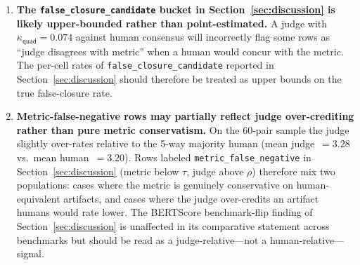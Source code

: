 \begin{enumerate}
  \item \textbf{The \texttt{false\_closure\_candidate} bucket in
        Section~\ref{sec:discussion} is likely upper-bounded rather
        than point-estimated.} A judge with $\kappa_{\textsf{quad}}
        = 0.074$ against human consensus will incorrectly flag some
        rows as ``judge disagrees with metric'' when a human would
        concur with the metric. The per-cell rates of
        \texttt{false\_closure\_candidate} reported in
        Section~\ref{sec:discussion} should therefore be treated as
        upper bounds on the true false-closure rate.

  \item \textbf{Metric-false-negative rows may partially reflect
        judge over-crediting rather than pure metric conservatism.}
        On the 60-pair sample the judge slightly over-rates relative
        to the 5-way majority human (mean judge~$= 3.28$ vs.\ mean
        human~$= 3.20$). Rows labeled \texttt{metric\_false\_negative}
        in Section~\ref{sec:discussion} (metric below $\tau$, judge
        above $\rho$) therefore mix two populations: cases where the
        metric is genuinely conservative on human-equivalent artifacts,
        and cases where the judge over-credits an artifact humans would
        rate lower. The BERTScore benchmark-flip finding of
        Section~\ref{sec:discussion} is unaffected in its comparative
        statement across benchmarks but should be read as a
        judge-relative---not a human-relative---signal.
\end{enumerate}
